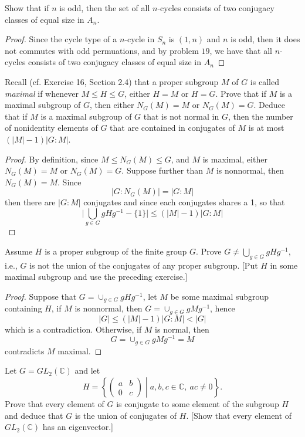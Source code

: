 \documentclass{article}
\newenvironment{problem}[2][Problem]{\begin{trivlist}
\item[\hskip \labelsep {\bfseries #1}\hskip \labelsep {\bfseries #2.}]}{\end{trivlist}}
\begin{document}
\begin{problem}{22}
    Show that if \( n \) is odd, then the set of all \( n \)-cycles consists of two conjugacy classes of equal size in \( A_n \).
\end{problem}
\begin{proof}
    Since the cycle type of a $n$-cycle in $S_n$ is $(1, n)$ and $n$ is odd, then it does not commutes with odd permuations, and by problem $19$, we have that all \( n \)-cycles consists of two conjugacy classes of equal size in \( A_n \)
\end{proof}
\begin{problem}{23}
    Recall (cf. Exercise 16, Section 2.4) that a proper subgroup \( M \) of \( G \) is called \textit{maximal} if whenever \( M \leq H \leq G \), either \( H = M \) or \( H = G \). Prove that if \( M \) is a maximal subgroup of \( G \), then either \( N_G(M) = M \) or \( N_G(M) = G \). Deduce that if \( M \) is a maximal subgroup of \( G \) that is not normal in \( G \), then the number of nonidentity elements of \( G \) that are contained in conjugates of \( M \) is at most \( (|M| - 1) |G : M| \).
\end{problem}
\begin{proof}
    By definition, since $M\leq N_G(M)\leq G$, and $M$ is maximal, either $N_G(M)=M$ or $N_G(M)=G$. Suppose further than $M$ is nonnormal, then $N_G(M)=M$. Since
    \[
        |G:N_G(M)| = |G:M|  
    \]
    then there are $|G:M|$ conjugates and since each conjugates shares a 1, so that 
    \[
    \bigg|\bigcup_{g \in G}gHg^{-1}-\{1\}\bigg|\leq (|M|-1)|G:M|
    \]
\end{proof}
\begin{problem}{24}
    Assume \( H \) is a proper subgroup of the finite group \( G \). Prove \( G \neq \bigcup_{g \in G} g H g^{-1} \), i.e., \( G \) is not the union of the conjugates of any proper subgroup. [Put \( H \) in some maximal subgroup and use the preceding exercise.]
\end{problem}
\begin{proof}
    Suppose that $G= \cup_{g \in G}g Hg^{-1}$, let $M$ be some maximal subgroup containing $H$, if $M$ is nonnormal, then $G= \cup_{g \in G}g Mg^{-1}$, hence 
    \[
    |G|\leq (|M|-1)|G:M|<|G|
    \]
    which is a contradiction. Otherwise, if $M$ is normal, then 
    \[
        G=\cup_{g \in G}g Mg^{-1} =M
    \]
    contradicts $M$ maximal.
\end{proof}
\begin{problem}{25}
    Let \( G = GL_2(\mathbb{C}) \) and let 
    \[
    H = \left\{ 
    \begin{pmatrix}
    a & b \\
    0 & c 
    \end{pmatrix}
    \middle| 
    a, b, c \in \mathbb{C}, \ ac \neq 0 
    \right\}.
    \]
    Prove that every element of \( G \) is conjugate to some element of the subgroup \( H \) and deduce that \( G \) is the union of conjugates of \( H \). [Show that every element of \( GL_2(\mathbb{C}) \) has an eigenvector.]
\end{problem}
\end{document}
